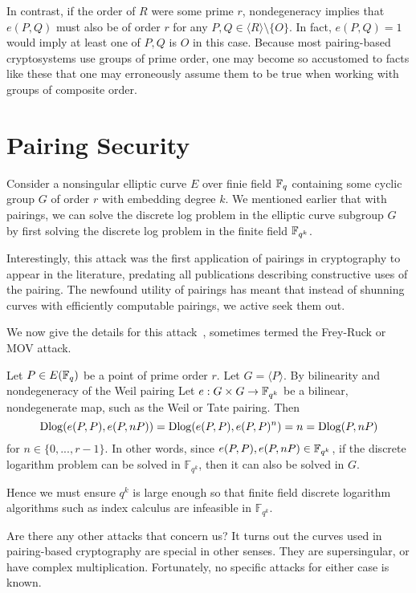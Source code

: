 In contrast, if the order of $R$ were some prime $r$, nondegeneracy implies
that $e(P, Q)$ must also be of order $r$ for any
$P, Q \in \langle R \rangle \setminus \{ O \}$.
In fact, $e(P, Q) = 1$ would imply at least one of $P, Q$ is $O$ in this case.
Because most pairing-based cryptosystems use groups of prime order,
one may become so accustomed to facts like these that one may erroneously
assume them to be true when working with groups of composite order.

\section {Pairing Security}

Consider a nonsingular elliptic curve $E$ over finie field $\mathbb{F}_q$ containing
some cyclic group $G$ of order $r$ with
embedding degree $k$.
We mentioned earlier that with pairings,
we can solve the discrete log problem in the elliptic curve subgroup $G$
by first solving the discrete log problem in the finite field $\mathbb{F}_{q^k}$.

Interestingly, this attack was the first application of pairings
in cryptography to appear in the literature,
predating all publications describing
constructive uses of the pairing.
The newfound utility
of pairings has meant that instead of shunning curves with efficiently
computable pairings, we active seek them out.

We now give the details for this attack~\cite{mov,fr},
sometimes termed the Frey-Ruck or MOV attack.

Let $P \in E(\mathbb{F}_q)$ be a point of prime order $r$.
Let $G = \langle P \rangle$.
By bilinearity and nondegeneracy of the Weil pairing
Let $e : G \times G \rightarrow \mathbb{F}_{q^k}$ be a bilinear, nondegenerate map,
such as the Weil or Tate pairing.
Then
\[ \mathop{\rm Dlog} ( e(P,P), e(P, nP) )
= \mathop{\rm Dlog} (e(P,P),e(P,P)^n) = n = \mathop{\rm Dlog}(P,nP) \]
for $n \in \{0,...,r-1\}$.
In other words, since $e(P,P), e(P, nP) \in \mathbb{F}_{q^k}$,
if the discrete logarithm problem can be solved
in $\mathbb{F}_{q^k}$, then it can also be solved in $G$.

Hence we must ensure $q^k$ is large enough so that
finite field discrete logarithm algorithms such as index calculus are
infeasible in $\mathbb{F}_{q^k}$.

Are there any other attacks that concern us? It turns out
the curves used in pairing-based cryptography are special in other senses.
They are supersingular, or have complex multiplication.
Fortunately, no specific attacks for either case is known.

